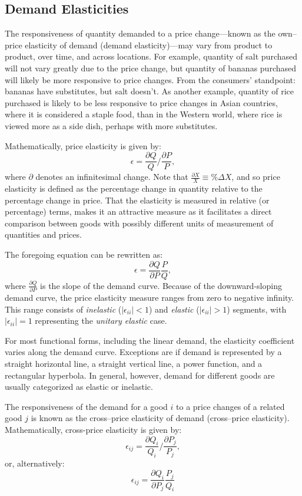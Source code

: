 \documentclass[]{book}
\begin{document}
\subsection{Demand Elasticities}\label{demand-elasticities}

The responsiveness of quantity demanded to a price change---known as the
own--price elasticity of demand (demand elasticity)---may vary from
product to product, over time, and across locations. For example,
quantity of salt purchased will not vary greatly due to the price
change, but quantity of bananas purchased will likely be more responsive
to price changes. From the consumers' standpoint: bananas have
substitutes, but salt doesn't. As another example, quantity of rice
purchased is likely to be less responsive to price changes in Asian
countries, where it is considered a staple food, than in the Western
world, where rice is viewed more as a side dish, perhaps with more
substitutes.

Mathematically, price elasticity is given by:
\[\epsilon = \frac{\partial Q}{Q}/\frac{\partial P}{P},\] where
\(\partial\) denotes an infinitesimal change. Note that
\(\frac{\partial X}{X} \equiv \%\Delta X\), and so price elasticity is
defined as the percentage change in quantity relative to the percentage
change in price. That the elasticity is measured in relative (or
percentage) terms, makes it an attractive measure as it facilitates a
direct comparison between goods with possibly different units of
measurement of quantities and prices.

The foregoing equation can be rewritten as:
\[\epsilon = \frac{\partial Q}{\partial P}\frac{P}{Q},\] where
\(\frac{\partial Q}{\partial P}\) is the slope of the demand curve.
Because of the downward-sloping demand curve, the price elasticity
measure ranges from zero to negative infinity. This range consists of
\emph{inelastic} (\(|\epsilon_{ii}| < 1\)) and \emph{elastic}
(\(|\epsilon_{ii}| > 1\)) segments, with \(|\epsilon_{ii}| = 1\)
representing the \emph{unitary elastic} case.

For most functional forms, including the linear demand, the elasticity
coefficient varies along the demand curve. Exceptions are if demand is
represented by a straight horizontal line, a straight vertical line, a
power function, and a rectangular hyperbola. In general, however, demand
for different goods are usually categorized as elastic or inelastic.

The responsiveness of the demand for a good \(i\) to a price changes of
a related good \(j\) is known as the cross--price elasticity of demand
(cross--price elasticity). Mathematically, cross-price elasticity is
given by:
\[\epsilon_{ij} = \frac{\partial Q_i}{Q_i}/\frac{\partial P_j}{P_j},\]
or, alternatively:
\[\epsilon_{ij} = \frac{\partial Q_i}{\partial P_j}\frac{P_j}{Q_i}\]
\end{document}
